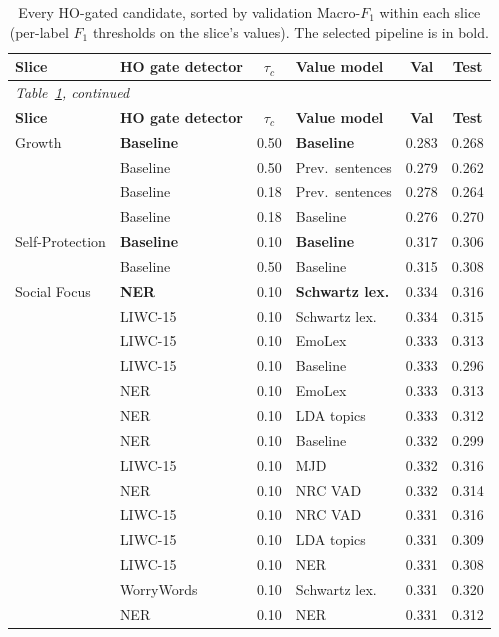 {\footnotesize
\begin{longtable}{llclcc}
\caption{Every HO-gated candidate, sorted by validation Macro-$F_1$ within each slice (per-label $F_1$ thresholds on the slice's values). The selected pipeline is in bold.}\label{tab:s8-gated}\\
\hline
\textbf{Slice} & \textbf{HO gate detector} & \textbf{$\tau_c$} & \textbf{Value model} & \textbf{Val} & \textbf{Test} \\
\hline
\endfirsthead
\multicolumn{6}{l}{\emph{Table~\ref{tab:s8-gated}, continued}}\\
\hline
\textbf{Slice} & \textbf{HO gate detector} & \textbf{$\tau_c$} & \textbf{Value model} & \textbf{Val} & \textbf{Test} \\
\hline
\endhead
\hline
\endfoot
Growth & \textbf{Baseline} & 0.50 & \textbf{Baseline} & 0.283 & 0.268 \\
 & Baseline & 0.50 & Prev.\ sentences & 0.279 & 0.262 \\
 & Baseline & 0.18 & Prev.\ sentences & 0.278 & 0.264 \\
 & Baseline & 0.18 & Baseline & 0.276 & 0.270 \\
Self-Protection & \textbf{Baseline} & 0.10 & \textbf{Baseline} & 0.317 & 0.306 \\
 & Baseline & 0.50 & Baseline & 0.315 & 0.308 \\
Social Focus & \textbf{NER} & 0.10 & \textbf{Schwartz lex.} & 0.334 & 0.316 \\
 & LIWC-15 & 0.10 & Schwartz lex. & 0.334 & 0.315 \\
 & LIWC-15 & 0.10 & EmoLex & 0.333 & 0.313 \\
 & LIWC-15 & 0.10 & Baseline & 0.333 & 0.296 \\
 & NER & 0.10 & EmoLex & 0.333 & 0.313 \\
 & NER & 0.10 & LDA topics & 0.333 & 0.312 \\
 & NER & 0.10 & Baseline & 0.332 & 0.299 \\
 & LIWC-15 & 0.10 & MJD & 0.332 & 0.316 \\
 & NER & 0.10 & NRC VAD & 0.332 & 0.314 \\
 & LIWC-15 & 0.10 & NRC VAD & 0.331 & 0.316 \\
 & LIWC-15 & 0.10 & LDA topics & 0.331 & 0.309 \\
 & LIWC-15 & 0.10 & NER & 0.331 & 0.308 \\
 & WorryWords & 0.10 & Schwartz lex. & 0.331 & 0.320 \\
 & NER & 0.10 & NER & 0.331 & 0.312 \\

\end{longtable}}
